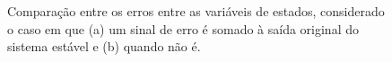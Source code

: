 \begin{figure}[H]
\begin{center}
\end{center}
\caption{Comparação entre os erros entre as variáveis de estados, considerado o caso em que (a) um sinal de erro é somado à saída original do sistema estável e (b) quando não é.}
\label{obs:est:err} 
\end{figure}

